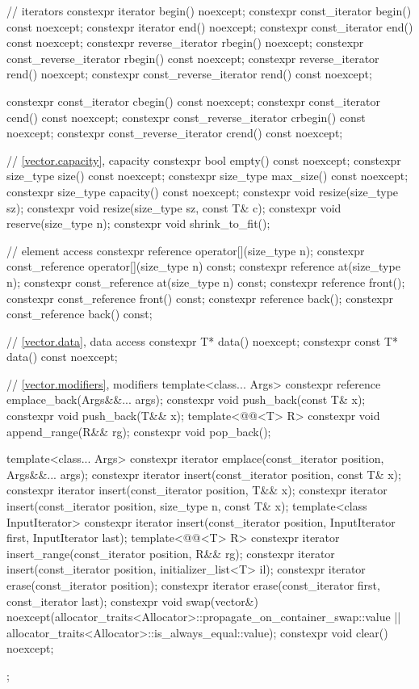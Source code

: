 \begin{codeblock}
{{    // iterators
    constexpr iterator               begin() noexcept;
    constexpr const_iterator         begin() const noexcept;
    constexpr iterator               end() noexcept;
    constexpr const_iterator         end() const noexcept;
    constexpr reverse_iterator       rbegin() noexcept;
    constexpr const_reverse_iterator rbegin() const noexcept;
    constexpr reverse_iterator       rend() noexcept;
    constexpr const_reverse_iterator rend() const noexcept;

    constexpr const_iterator         cbegin() const noexcept;
    constexpr const_iterator         cend() const noexcept;
    constexpr const_reverse_iterator crbegin() const noexcept;
    constexpr const_reverse_iterator crend() const noexcept;

    // \ref{vector.capacity}, capacity
    constexpr bool empty() const noexcept;
    constexpr size_type size() const noexcept;
    constexpr size_type max_size() const noexcept;
    constexpr size_type capacity() const noexcept;
    constexpr void      resize(size_type sz);
    constexpr void      resize(size_type sz, const T& c);
    constexpr void      reserve(size_type n);
    constexpr void      shrink_to_fit();

    // element access
    constexpr reference       operator[](size_type n);
    constexpr const_reference operator[](size_type n) const;
    constexpr reference       at(size_type n);
    constexpr const_reference at(size_type n) const;
    constexpr reference       front();
    constexpr const_reference front() const;
    constexpr reference       back();
    constexpr const_reference back() const;

    // \ref{vector.data}, data access
    constexpr T*       data() noexcept;
    constexpr const T* data() const noexcept;

    // \ref{vector.modifiers}, modifiers
    template<class... Args> constexpr reference emplace_back(Args&&... args);
    constexpr void push_back(const T& x);
    constexpr void push_back(T&& x);
    template<@@<T> R>
      constexpr void append_range(R&& rg);
    constexpr void pop_back();

    template<class... Args> constexpr iterator emplace(const_iterator position, Args&&... args);
    constexpr iterator insert(const_iterator position, const T& x);
    constexpr iterator insert(const_iterator position, T&& x);
    constexpr iterator insert(const_iterator position, size_type n, const T& x);
    template<class InputIterator>
      constexpr iterator insert(const_iterator position,
                                InputIterator first, InputIterator last);
    template<@@<T> R>
      constexpr iterator insert_range(const_iterator position, R&& rg);
    constexpr iterator insert(const_iterator position, initializer_list<T> il);
    constexpr iterator erase(const_iterator position);
    constexpr iterator erase(const_iterator first, const_iterator last);
    constexpr void     swap(vector&)
      noexcept(allocator_traits<Allocator>::propagate_on_container_swap::value ||
               allocator_traits<Allocator>::is_always_equal::value);
    constexpr void     clear() noexcept;
  };

}
\end{codeblock}
